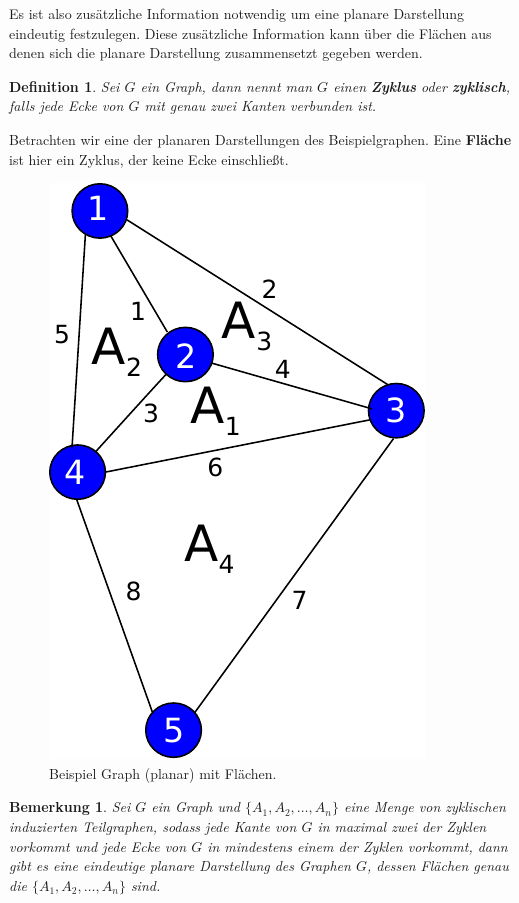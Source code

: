 \documentclass[11pt,a4paper,leqno]{report}
\newtheorem{definition}[theorem]{Definition}
\newtheorem{remark}[theorem]{Bemerkung}
\numberwithin{equation}{chapter}
\begin{document}
\noindent
Es ist also zus\"atzliche Information notwendig um eine planare Darstellung eindeutig festzulegen. Diese zus\"atzliche Information kann \"uber die Fl\"achen aus denen sich die planare Darstellung zusammensetzt gegeben werden.\\
\begin{definition}
	Sei $G$ ein Graph, dann nennt man $G$ einen \textbf{Zyklus} oder \textbf{zyklisch}, falls jede Ecke von $G$ mit genau zwei Kanten verbunden ist.
\end{definition}
\noindent
Betrachten wir eine der planaren Darstellungen des Beispielgraphen. Eine \textbf{Fl\"ache} ist hier ein Zyklus, der keine Ecke einschlie\ss{}t.
\begin{figure}[H]
	\begin{center}
		\includegraphics[scale=0.3]{Abbildungen/graph_1_planar_flach.pdf}
		\caption{Beispiel Graph (planar) mit Fl\"achen.}
	\end{center}
\end{figure}
\noindent
\begin{remark}
	Sei $G$ ein Graph und $\{A_1, A_2, \dots, A_n\}$ eine Menge von zyklischen induzierten Teilgraphen, sodass jede Kante von $G$ in maximal zwei der Zyklen vorkommt und jede Ecke von $G$ in mindestens einem der Zyklen vorkommt, dann gibt es eine eindeutige planare Darstellung des Graphen $G$, dessen Fl\"achen genau die $\{A_1, A_2, \dots, A_n\}$ sind.  
\end{remark}
\end{document}
